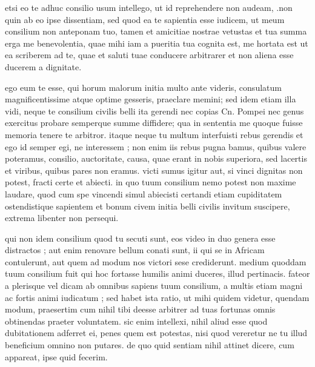 


 etsi eo te adhuc consilio usum intellego, ut id reprehendere non audeam, .non quin ab eo ipse dissentiam, sed quod ea te sapientia esse iudicem, ut meum consilium non anteponam tuo, tamen et amicitiae nostrae vetustas et tua summa erga me benevolentia, quae mihi iam a pueritia tua cognita est, me hortata est ut ea scriberem ad te, quae et saluti tuae conducere arbitrarer et non aliena esse ducerem a dignitate.

 ego eum te esse, qui horum malorum initia multo ante videris, consulatum magnificentissime atque optime gesseris, praeclare memini; sed idem etiam illa vidi, neque te consilium civilis belli ita gerendi nec copias Cn. Pompei nec genus exercitus probare semperque summe diffidere; qua in sententia me quoque fuisse memoria tenere te arbitror. itaque neque tu multum interfuisti rebus gerendis et ego id semper egi, ne interessem ; non enim iis rebus pugna bamus, quibus valere poteramus, consilio, auctoritate, causa, quae erant in nobis superiora, sed lacertis et viribus, quibus pares non eramus. victi sumus igitur aut, si vinci dignitas non potest, fracti certe et abiecti. in quo tuum consilium nemo potest non maxime laudare, quod cum spe vincendi simul abiecisti certandi etiam cupiditatem ostendistique sapientem et bonum civem initia belli civilis invitum suscipere, extrema libenter non persequi.

 qui non idem consilium quod tu secuti sunt, eos video in duo genera esse distractos ; aut enim renovare bellum conati sunt, ii qui se in Africam contulerunt, aut quem ad modum nos victori sese crediderunt. medium quoddam tuum consilium fuit qui hoc fortasse humilis animi duceres, illud pertinacis. fateor a plerisque vel dicam ab omnibus sapiens tuum consilium, a multis etiam magni ac fortis animi iudicatum ; sed habet ista ratio, ut mihi quidem videtur, quendam modum, praesertim cum nihil tibi deesse arbitrer ad tuas fortunas omnis obtinendas praeter voluntatem. sic enim intellexi, nihil aliud esse quod dubitationem adferret ei, penes quem est potestas, nisi quod vereretur ne tu illud beneficium omnino non putares. de quo quid sentiam nihil attinet dicere, cum appareat, ipse quid fecerim.

